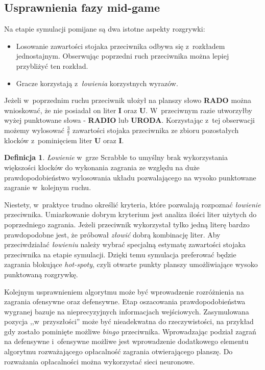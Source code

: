 \documentclass[a4paper,twocolumn,12pt]{article}
\theoremstyle{definition}
\newtheorem{definition}{Definicja}
\begin{document}
\subsection*{Usprawnienia fazy mid-game}

Na etapie symulacji pomijane są dwa istotne aspekty rozgrywki:

\begin{itemize}
	\item Losowanie zawartości stojaka przeciwnika odbywa się z~rozkładem jednostajnym. Obserwując poprzedni ruch przeciwnika można lepiej przybliżyć ten rozkład.
	\item Gracze korzystają z~\emph{łowienia} korzystnych wyrazów.
\end{itemize}

Jeżeli w~poprzednim ruchu przeciwnik ułożył na planszy słowo \textbf{RADO} można wnioskować, że nie posiadał on liter \textbf{I} oraz \textbf{U}. W~przeciwnym razie utworzyłby wyżej punktowane słowa - \textbf{RADIO} lub \textbf{URODA}. Korzystając z~tej obserwacji możemy wylosować $\frac{3}{7}$ zawartości stojaka przeciwnika ze zbioru pozostałych klocków z~pominięciem liter \textbf{U} oraz \textbf{I}. 

\begin{definition}
	\emph{Łowienie} w~grze Scrabble to umyślny brak wykorzystania większości klocków do wykonania zagrania ze względu na duże prawdopodobieństwo wylosowania układu pozwalającego na wysoko punktowane zagranie w~kolejnym ruchu.
\end{definition}

Niestety, w~praktyce trudno określić kryteria, które pozwalają rozpoznać \emph{łowienie} przeciwnika. Umiarkowanie dobrym kryterium jest analiza ilości liter użytych do poprzedniego zagrania. Jeżeli przeciwnik wykorzystał tylko jedną literę bardzo prawdopodobne jest, że próbował \emph{złowić} dobrą kombinację liter. Aby przeciwdziałać \emph{łowieniu} należy wybrać specjalną estymatę zawartości stojaka przeciwnika na etapie symulacji. Dzięki temu symulacja preferować będzie zagrania blokujące \emph{hot-spoty}, czyli otwarte punkty planszy umożliwiające wysoko punktowaną rozgrywkę.

Kolejnym usprawnieniem algorytmu może być wprowadzenie rozróżnienia na zagrania ofensywne oraz defensywne. Etap oszacowania prawdopodobieństwa wygranej bazuje na nieprecyzyjnych informacjach wejściowych. Zasymulowana pozycja ,,w~przyszłości'' może być nieadekwatna do rzeczywistości, na przykład gdy zostało pominięte możliwe \emph{bingo} przeciwnika. Wprowadzając podział zagrań na defensywne i~ofensywne możliwe jest wprowadzenie dodatkowego elementu algorytmu rozważającego opłacalność zagrania otwierającego planszę. Do rozważania opłacalności można wykorzystać sieci neuronowe.
\end{document}
